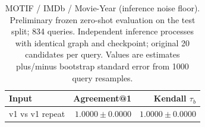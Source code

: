 \begin{table}[t]
\centering
\small
\begin{tabular}{lrr}
\toprule
Input & Agreement@1 & Kendall $\tau_b$ \\
\midrule
v1 vs v1 repeat & $1.0000 \pm 0.0000$ & $1.0000 \pm 0.0000$ \\
\bottomrule
\end{tabular}
\caption{MOTIF / IMDb / Movie-Year (inference noise floor). Preliminary frozen zero-shot evaluation on the test split; 834 queries. Independent inference processes with identical graph and checkpoint; original 20 candidates per query. Values are estimates plus/minus bootstrap standard error from 1000 query resamples.}
\label{tab:motif-movie_year-noise}
\end{table}
